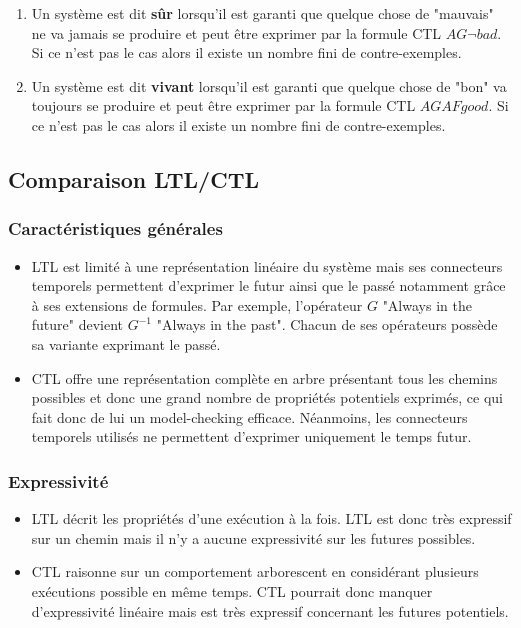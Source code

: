 \documentclass[runningheads,a4paper,10pt]{llncs}
\begin{document}
\begin{enumerate}
\item Un système est dit \textbf{sûr} lorsqu'il est garanti que quelque chose de "mauvais" ne va jamais se produire et peut être exprimer par la formule CTL $AG\neg bad$.  Si ce n'est pas le cas alors il existe un nombre fini de contre-exemples. 
\item Un système est dit \textbf{vivant} lorsqu'il est garanti que quelque chose de "bon" va toujours se produire et peut être exprimer par la formule CTL $AGAFgood$. Si ce n'est pas le cas alors il existe un nombre fini de contre-exemples. 
\end{enumerate}



\subsection{Comparaison LTL/CTL}

\subsubsection{Caractéristiques générales}
\begin{itemize}
\item LTL est limité à une représentation linéaire du système mais ses connecteurs temporels permettent d'exprimer le futur ainsi que le passé notamment grâce à ses extensions de formules. Par exemple, l'opérateur $G$ "Always in the future" devient $G^{-1}$ "Always in the past". Chacun de ses opérateurs possède sa variante exprimant le passé. 
\item CTL offre une représentation complète en arbre présentant tous les chemins possibles et donc une grand nombre de propriétés potentiels exprimés, ce qui fait donc de lui un model-checking efficace. Néanmoins, les connecteurs temporels utilisés ne permettent d'exprimer uniquement le temps futur. 
\end{itemize} 


\subsubsection{Expressivité}
\begin{itemize}
\item LTL décrit les propriétés d'une exécution à la fois. LTL est donc très expressif sur un chemin mais il n'y a aucune expressivité sur les futures possibles. 
\item CTL raisonne sur un comportement arborescent en considérant plusieurs exécutions possible en même temps. CTL pourrait donc manquer d'expressivité linéaire mais est très expressif concernant les futures potentiels. \\
\end{itemize}
\end{document}

